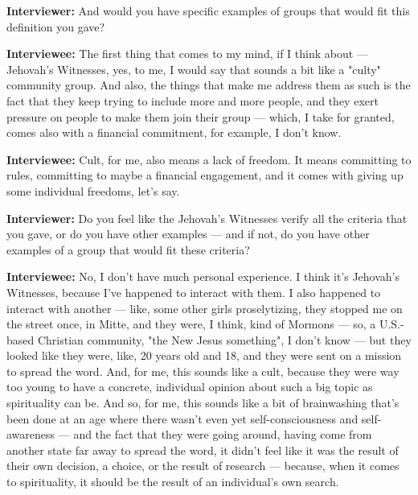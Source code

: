 \textbf{Interviewer:} And would you have specific examples of groups that would fit this definition you gave?

\textbf{Interviewee:} The first thing that comes to my mind, if I think about — Jehovah's Witnesses, yes, to me, I would say that sounds a bit like a "culty" community group. And also, the things that make me address them as such is the fact that they keep trying to include more and more people, and they exert pressure on people to make them join their group — which, I take for granted, comes also with a financial commitment, for example, I don't know.

\textbf{Interviewee:} Cult, for me, also means a lack of freedom. It means committing to rules, committing to maybe a financial engagement, and it comes with giving up some individual freedoms, let's say.

\textbf{Interviewer:} Do you feel like the Jehovah's Witnesses verify all the criteria that you gave, or do you have other examples — and if not, do you have other examples of a group that would fit these criteria?

\textbf{Interviewee:} No, I don't have much personal experience. I think it's Jehovah's Witnesses, because I've happened to interact with them. I also happened to interact with another — like, some other girls proselytizing, they stopped me on the street once, in Mitte, and they were, I think, kind of Mormons — so, a U.S.-based Christian community, "the New Jesus something", I don't know — but they looked like they were, like, 20 years old and 18, and they were sent on a mission to spread the word. And, for me, this sounds like a cult, because they were way too young to have a concrete, individual opinion about such a big topic as spirituality can be. And so, for me, this sounds like a bit of brainwashing that's been done at an age where there wasn't even yet self-consciousness and self-awareness — and the fact that they were going around, having come from another state far away to spread the word, it didn't feel like it was the result of their own decision, a choice, or the result of research — because, when it comes to spirituality, it should be the result of an individual's own search.


